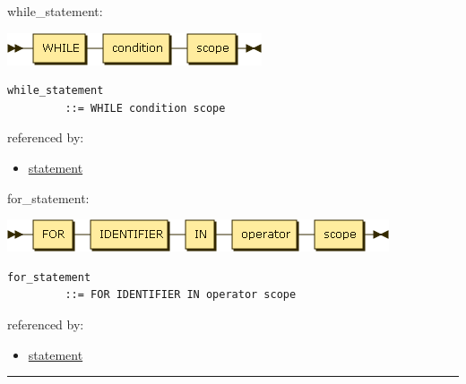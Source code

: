 \begin{minipage}{\textwidth}
\protect\hypertarget{while_statement}{}{while\_statement:}

\includegraphics[width=2.95833in,height=0.37500in]{diagram/while_statement.png}

\begin{verbatim}
while_statement
         ::= WHILE condition scope
\end{verbatim}

referenced by:

\begin{itemize}
\tightlist
\item
  \protect\hyperlink{statement}{statement}
\end{itemize}

\end{minipage}

\begin{minipage}{\textwidth}
\protect\hypertarget{for_statement}{}{for\_statement:}

\includegraphics[width=4.43750in,height=0.37500in]{diagram/for_statement.png}

\begin{verbatim}
for_statement
         ::= FOR IDENTIFIER IN operator scope
\end{verbatim}

referenced by:

\begin{itemize}
\tightlist
\item
  \protect\hyperlink{statement}{statement}
\end{itemize}

\end{minipage}

\begin{center}\rule{0.5\linewidth}{\linethickness}\end{center}

